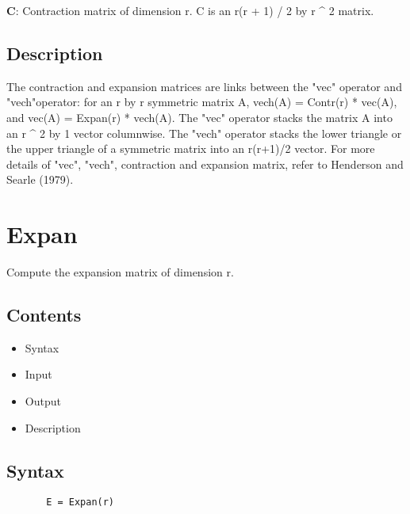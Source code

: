 \documentclass[a4paper,11pt,openany]{memoir}
\begin{document}
\begin{par}
\textbf{C}: Contraction matrix of dimension r.  C is an r(r + 1) / 2 by r \^{} 2 matrix.
\end{par} \vspace{1em}


\subsection*{Description}

\begin{par}
The contraction and expansion matrices are links between the "vec" operator and "vech"operator: for an r by r symmetric matrix A, vech(A) = Contr(r) * vec(A), and vec(A) = Expan(r) * vech(A). The "vec" operator stacks the matrix A into an r \^{} 2 by 1 vector columnwise.  The "vech" operator stacks the lower triangle or the upper triangle of a symmetric matrix into an r(r+1)/2 vector. For more details of "vec", "vech", contraction and expansion matrix, refer to Henderson and Searle (1979).
\end{par} \vspace{1em}

\newpage

\rmfamily
\color{black}\section{Expan}

\begin{par}
Compute the expansion matrix of dimension r.
\end{par} \vspace{1em}

\subsection*{Contents}

\begin{itemize}
\setlength{\itemsep}{-1ex}
   \item Syntax
   \item Input
   \item Output
   \item Description
\end{itemize}


\subsection*{Syntax}


\begin{verbatim}       E = Expan(r)\end{verbatim}
    
\end{document}
